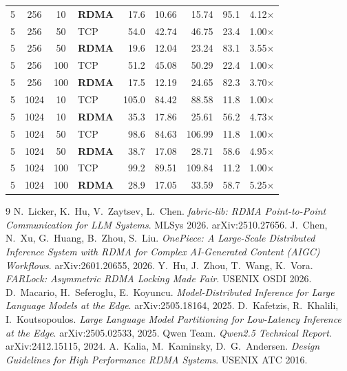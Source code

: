 \documentclass[11pt,a4paper]{article}
\begin{document}
{\begin{longtable}{@{}ccclrrrrr@{}}
5 & 256 & 10 & \textbf{RDMA} & 17.6 & 10.66 & 15.74 & 95.1 & 4.12$\times$ \\
5 & 256 & 50 & TCP & 54.0 & 42.74 & 46.75 & 23.4 & 1.00$\times$ \\
5 & 256 & 50 & \textbf{RDMA} & 19.6 & 12.04 & 23.24 & 83.1 & 3.55$\times$ \\
5 & 256 & 100 & TCP & 51.2 & 45.08 & 50.29 & 22.4 & 1.00$\times$ \\
5 & 256 & 100 & \textbf{RDMA} & 17.5 & 12.19 & 24.65 & 82.3 & 3.70$\times$ \\
\midrule
5 & 1024 & 10 & TCP & 105.0 & 84.42 & 88.58 & 11.8 & 1.00$\times$ \\
5 & 1024 & 10 & \textbf{RDMA} & 35.3 & 17.86 & 25.61 & 56.2 & 4.73$\times$ \\
5 & 1024 & 50 & TCP & 98.6 & 84.63 & 106.99 & 11.8 & 1.00$\times$ \\
5 & 1024 & 50 & \textbf{RDMA} & 38.7 & 17.08 & 28.71 & 58.6 & 4.95$\times$ \\
5 & 1024 & 100 & TCP & 99.2 & 89.51 & 109.84 & 11.2 & 1.00$\times$ \\
5 & 1024 & 100 & \textbf{RDMA} & 28.9 & 17.05 & 33.59 & 58.7 & 5.25$\times$ \\
\end{longtable}
}

\begin{thebibliography}{9}
 N.~Licker, K.~Hu, V.~Zaytsev, L.~Chen. \emph{fabric-lib: RDMA Point-to-Point Communication for LLM Systems}. MLSys 2026. arXiv:2510.27656.
 J.~Chen, N.~Xu, G.~Huang, B.~Zhou, S.~Liu. \emph{OnePiece: A Large-Scale Distributed Inference System with RDMA for Complex AI-Generated Content (AIGC) Workflows}. arXiv:2601.20655, 2026.
 Y.~Hu, J.~Zhou, T.~Wang, K.~Vora. \emph{FARLock: Asymmetric RDMA Locking Made Fair}. USENIX OSDI 2026.
 D.~Macario, H.~Seferoglu, E.~Koyuncu. \emph{Model-Distributed Inference for Large Language Models at the Edge}. arXiv:2505.18164, 2025.
 D.~Kafetzis, R.~Khalili, I.~Koutsopoulos. \emph{Large Language Model Partitioning for Low-Latency Inference at the Edge}. arXiv:2505.02533, 2025.
 Qwen Team. \emph{Qwen2.5 Technical Report}. arXiv:2412.15115, 2024.
 A.~Kalia, M.~Kaminsky, D.~G.~Andersen. \emph{Design Guidelines for High Performance RDMA Systems}. USENIX ATC 2016.
\end{thebibliography}
\end{document}
